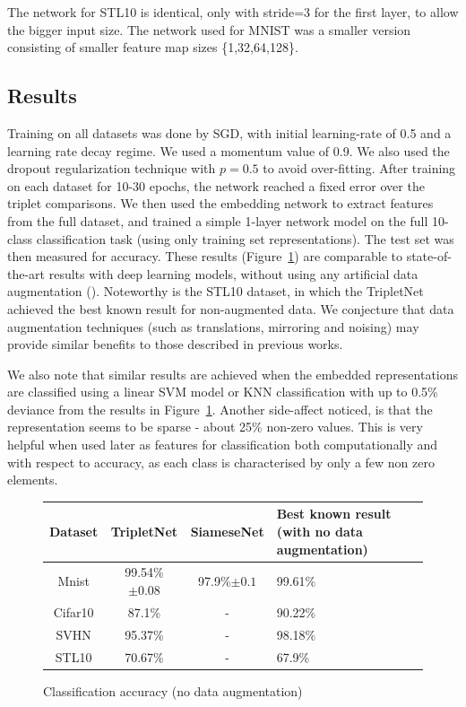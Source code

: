 \documentclass{article} %
\begin{document}
 The network for STL10 is identical, only with stride=3 for the first layer, to allow the bigger input size. The network used for MNIST was a smaller version consisting of smaller feature map sizes \{1,32,64,128\}.



\subsection{Results}
Training on all datasets was done by SGD, with initial learning-rate of 0.5 and a learning rate decay regime. We used a momentum value of 0.9. We also used the dropout regularization technique with $p=0.5$ to avoid over-fitting.
After training on each dataset for 10-30 epochs, the network reached a fixed error over the triplet comparisons.
  We then used the embedding network to extract features from the full dataset, and trained a simple 1-layer network model on the full 10-class classification task (using only training set representations).  The test set was then measured for accuracy.  
  These results (Figure~\ref{results}) are comparable to state-of-the-art results with deep learning models, without using any artificial data augmentation (\citet{zeiler2013stochastic,goodfellow2013maxout,LinCY13}). 
  Noteworthy is the STL10 dataset, in which the TripletNet achieved the best known result for non-augmented data.
  We conjecture that data augmentation techniques (such as translations, mirroring and noising) may provide similar benefits to those described in previous works.

    We also note that similar results are achieved when the embedded representations are classified using a linear SVM model or KNN classification with up to 0.5\% deviance from the results in Figure~\ref{results}.
Another side-affect noticed, is that the representation seems to be sparse - about 25\% non-zero values. This is very helpful when used later as features for classification both computationally and with respect to accuracy, as each class is characterised by only a few non zero elements.  
  
  


\begin{figure}[h]

    \begin{tabular}{ | c | c | c | p{8cm} |}
    \hline
    Dataset & TripletNet   & SiameseNet  & Best known result (with no data augmentation)       \\ \hline
    Mnist & 99.54\%$\pm 0.08$ & 97.9\%$\pm 0.1$& 99.61\% \citet{mairal2014convolutional,lee2014deeply}  \\ \hline
    Cifar10 & 87.1\% & - & 90.22\% \citet{lee2014deeply}  \\ \hline
    SVHN &  95.37\% & -& 98.18\% \citet{lee2014deeply} \\ \hline
    STL10& 70.67\%& - & 67.9\% \citet{lin2014stable}\\ \hline
    \end{tabular}
     \caption{Classification accuracy (no data augmentation)}\label{results}
     \end{figure}
\end{document}
